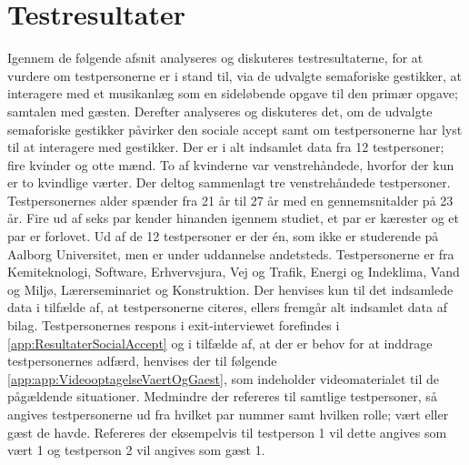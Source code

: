\chapter{Testresultater}
\label{TestresultaterSocialAccept}
%
Igennem de følgende afsnit analyseres og diskuteres testresultaterne, for at vurdere om testpersonerne er i stand til, via de udvalgte semaforiske gestikker, at interagere med et musikanlæg som en sideløbende opgave til den primær opgave; samtalen med gæsten. Derefter analyseres og diskuteres det, om de udvalgte semaforiske gestikker påvirker den sociale accept samt om testpersonerne har lyst til at interagere med gestikker.\blankline
%
Der er i alt indsamlet data fra 12 testpersoner; fire kvinder og otte mænd. To af kvinderne var venstrehåndede, hvorfor der kun er to kvindlige værter. Der deltog sammenlagt tre venstrehåndede testpersoner. Testpersonernes alder spænder fra 21 år til 27 år med en gennemsnitalder på 23 år. Fire ud af seks par kender hinanden igennem studiet, et par er kærester og et par er forlovet. Ud af de 12 testpersoner er der én, som ikke er studerende på Aalborg Universitet, men er under uddannelse andetsteds. Testpersonerne er fra Kemiteknologi, Software, Erhvervsjura, Vej og Trafik, Energi og Indeklima, Vand og Miljø, Lærerseminariet og Konstruktion. Der henvises kun til det indsamlede data i tilfælde af, at testpersonerne citeres, ellers fremgår alt indsamlet data af bilag. Testpersonernes respons i exit-interviewet forefindes i \autoref{app:ResultaterSocialAccept} og i tilfælde af, at der er behov for at inddrage testpersonernes adfærd, henvises der til følgende \autoref{app:app:VideooptagelseVaertOgGaest}, som indeholder videomaterialet til de pågældende situationer. Medmindre der refereres til samtlige testpersoner, så angives testpersonerne ud fra hvilket par nummer samt hvilken rolle; vært eller gæst de havde. Refereres der eksempelvis til testperson 1 vil dette angives som vært 1 og testperson 2 vil angives som gæst 1. 



